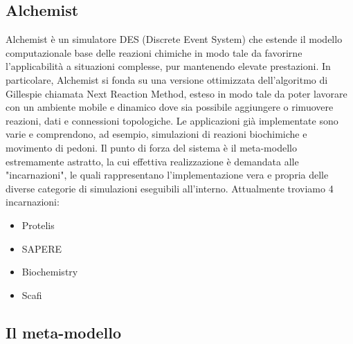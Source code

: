 \documentclass[12pt,a4paper,openright,twoside]{book}
\begin{document}
\subsection{Alchemist}
Alchemist \cite{Pianini_2013} è un simulatore DES (Discrete Event System) che estende il modello computazionale 
base delle reazioni chimiche in modo tale da favorirne l’applicabilità a situazioni complesse,
pur mantenendo elevate prestazioni. In particolare, Alchemist si fonda su una versione ottimizzata 
dell’algoritmo di Gillespie\cite{gillespie1977exact} chiamata Next Reaction Method\cite{gibson2000efficient}, esteso in modo tale da poter lavorare 
con un ambiente mobile e dinamico dove sia possibile aggiungere o rimuovere reazioni, dati e
connessioni topologiche. Le applicazioni già implementate sono varie e comprendono, ad esempio, 
simulazioni di reazioni biochimiche e movimento di pedoni. Il punto di forza del sistema è il 
meta-modello estremamente astratto, la cui effettiva realizzazione è demandata alle "incarnazioni",
le quali rappresentano l’implementazione vera e propria delle diverse categorie di simulazioni 
eseguibili all’interno. Attualmente troviamo 4 incarnazioni: 
\begin{itemize}
    \item Protelis
    \item SAPERE
    \item Biochemistry
    \item Scafi
\end{itemize}
\subsection{Il meta-modello}
\end{document}
